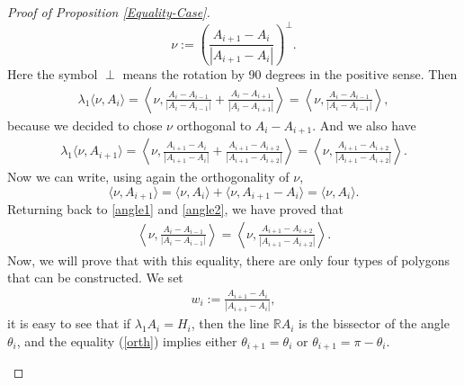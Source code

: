 \documentclass[12pt,english]{smfart} %
\theoremstyle{remark}
\newcommand{\R}{\mathbb{R}}
\begin{document}
\begin{proof}[Proof of Proposition \ref{Equality-Case}]
$$\nu:=\left(\frac{A_{i+1}-A_{i}}{|A_{i+1}-A_i|}\right)^{\bot}.$$ 
Here the symbol $\perp$ means the rotation by 90 degrees in the positive sense. Then 
\begin{eqnarray}
\lambda_1 \langle \nu , A_i \rangle= \left\langle \nu ,  \frac{A_{i}-A_{i-1}}{|A_{i}-A_{i-1}|} + \frac{A_i - A_{i+1}}{|A_{i}-A_{i+1}|} \right\rangle  =\left\langle \nu ,  \frac{A_{i}-A_{i-1}}{|A_i-A_{i-1}|} \right\rangle, \label{angle1}
\end{eqnarray}
because we decided to chose $\nu$ orthogonal to $A_i-A_{i+1}$. And we also have
\begin{eqnarray}
\lambda_1 \langle \nu , A_{i+1} \rangle= \left\langle \nu ,  \frac{A_{i+1}-A_{i}}{|A_{i+1}-A_{i}|} + \frac{A_{i+1} - A_{i+2}}{|A_{i+1}-A_{i+2}|} \right\rangle=\left\langle \nu ,  \frac{A_{i+1}-A_{i+2}}{|A_{i+1}-A_{i+2}|} \right\rangle.\label{angle2}
\end{eqnarray}
Now we can write, using again the orthogonality of $\nu$,
$$\langle \nu , A_{i+1} \rangle= \langle \nu , A_i \rangle +\langle \nu , A_{i+1}-A_i \rangle=\langle \nu,A_i \rangle.$$
Returning back to \eqref{angle1} and \eqref{angle2}, we have proved that 
\begin{align}\label{orth}
    \left\langle \nu ,  \frac{A_{i}-A_{i-1}}{|A_i-A_{i-1}|} \right\rangle=\left\langle \nu ,  \frac{A_{i+1}-A_{i+2}}{|A_{i+1}-A_{i+2}|} \right\rangle.
\end{align}
Now, we will prove that with this equality, there are only four types of polygons that can be constructed. We set
\begin{align*}
    w_i := \frac{A_{i+1}-A_{i}}{|A_{i+1}-A_{i}|},
\end{align*}
it is easy to see that if $\lambda_1A_i=H_i$, then the line $\R A_i$ is the bissector of the angle $\theta_i$, and the equality (\ref{orth}) implies either $\theta_{i+1} = \theta_i$ or $\theta_{i+1}= \pi -\theta_i$.
\begin{center}
    





\begin{tikzpicture}[x=0.75pt,y=0.75pt,yscale=-1,xscale=1]


\end{tikzpicture}
\end{center}
\end{proof}
\end{document}
